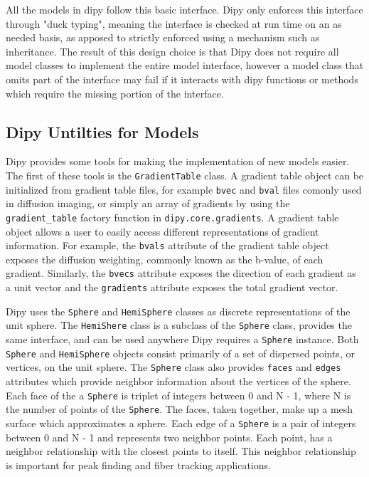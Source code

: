 All the models in dipy follow this basic interface. Dipy only enforces this interface through "duck typing", meaning the interface is checked at run time on an as needed basis, as apposed to strictly enforced using a mechanism such as inheritance. The result of this design choice is that Dipy does not require all model classes to implement the entire model interface, however a model class that omits part of the interface may fail if it interacts with dipy functions or methods which require the missing portion of the interface.

\subsection{Dipy Untilties for Models}
Dipy provides some tools for making the implementation of new models easier. The first of these tools is the \verb|GradientTable| class. A gradient table object can be initialized from gradient table files, for example \verb|bvec| and \verb|bval| files comonly used in diffusion imaging, or simply an array of gradients by using the \verb|gradient_table| factory function in \verb|dipy.core.gradients|. A gradient table object allows a user to easily access different representations of gradient information. For example, the \verb|bvals| attribute of the gradient table object exposes the diffusion weighting, commonly known as the b-value, of each gradient. Similarly, the \verb|bvecs| attribute exposes the direction of each gradient as a unit vector and the \verb|gradients| attribute exposes the total gradient vector.

Dipy uses the \verb|Sphere| and \verb|HemiSphere| classes as discrete representations of the unit sphere. The \verb|HemiShere| class is a subclass of the \verb|Sphere| class, provides the same interface, and can be used anywhere Dipy requires a \verb|Sphere| instance.  Both \verb|Sphere| and \verb|HemiSphere| objects consist primarily of a set of dispersed points, or vertices, on the unit sphere. The \verb|Sphere| class also provides \verb|faces| and \verb|edges| attributes which provide neighbor information about the vertices of the sphere. Each face of the a \verb|Sphere| is triplet of integers between 0 and N - 1, where N is the number of points of the \verb|Sphere|. The faces, taken together, make up a mesh surface which approximates a sphere. Each edge of a \verb|Sphere| is a pair of integers between 0 and N - 1 and represents two neighbor points. Each point, has a neighbor relationship with the closest points to itself. This neighbor relationship is important for peak finding and fiber tracking applications.

